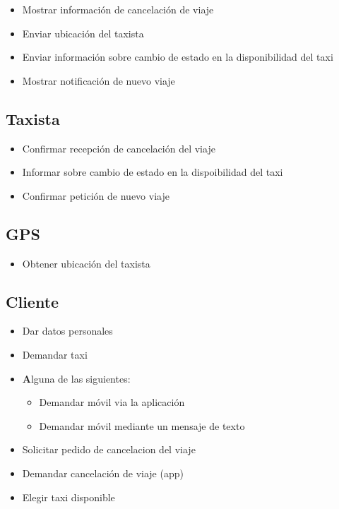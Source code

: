 \documentclass[a4paper]{article}
\begin{document}
\begin{itemize}
 \item Mostrar informaci\'on de cancelaci\'on de viaje
 \item Enviar ubicaci\'on del taxista
 \item Enviar informaci\'on sobre cambio de estado en la disponibilidad del taxi
 \item Mostrar notificaci\'on de nuevo viaje
 
 \end{itemize}

\subsection{Taxista}
\begin{itemize}
 \item Confirmar recepci\'on de cancelaci\'on del viaje
 \item Informar sobre cambio de estado en la dispoibilidad del taxi
 \item Confirmar petici\'on de nuevo viaje
\end{itemize}

\subsection{GPS}
\begin{itemize}
 \item Obtener ubicaci\'on del taxista
\end{itemize}


\subsection{Cliente}
\begin{itemize}
\item Dar datos personales
\item Demandar taxi
\item \textbf Alguna de las siguientes:
	\begin{itemize}
		\item Demandar m\'ovil via la aplicaci\'on 
		\item Demandar m\'ovil mediante un mensaje de texto
	\end{itemize}
\item Solicitar pedido de cancelacion del viaje
\item Demandar cancelaci\'on de viaje (app)
\item Elegir taxi disponible

\end{itemize}
\end{document}
